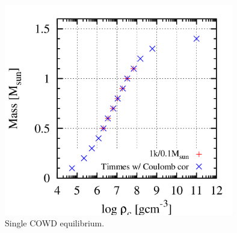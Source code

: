 \documentclass[fleqn,dvipdfmx]{article}
\begin{document}
\begin{figure}
  \begin{center}
    \includegraphics[width=10cm,bb=0 0 520 480]{fig/wdeq/draw.png}
  \end{center}
  \caption{Single COWD equilibrium.}
\end{figure}
\end{document}
